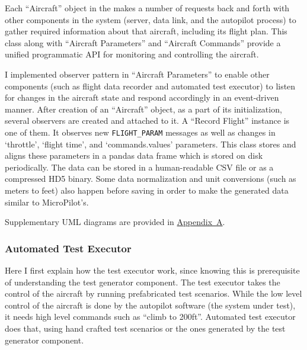 Each ``Aircraft'' object in the makes a number of requests back and forth with other components in the system (server, data link, and the autopilot process) to gather required information about that aircraft, including its flight plan. This class along with ``Aircraft Parameters'' and ``Aircraft Commands'' provide a unified programmatic API for monitoring and controlling the aircraft. 

I implemented observer pattern \cite{gamma1995design} in ``Aircraft Parameters'' to enable other components (such as flight data recorder and automated test executor) to listen for changes in the aircraft state and respond accordingly in an event-driven manner. 
After creation of an ``Aircraft'' object, as a part of its initialization, several observers are created and attached to it. A ``Record Flight'' instance is one of them. It observes new \verb|FLIGHT_PARAM| messages as well as changes in `throttle', `flight time', and `commands.values' parameters. This class stores and aligns these parameters in a pandas data frame which is stored on disk periodically. The data can be stored in a human-readable CSV file or as a compressed HD5 binary. Some data normalization and unit conversions (such as meters to feet) also happen before saving in order to make the generated data similar to MicroPilot's.

Supplementary UML diagrams are provided in \hyperref[appendixa]{Appendix~A}.


\subsubsection{Automated Test Executor}
Here I first explain how the test executor work, since knowing this is prerequisite of understanding the test generator component.
The test executor takes the control of the aircraft by running prefabricated test scenarios. While the low level control of the aircraft is done by the autopilot software (the system under test), it needs high level commands such as ``climb to 200ft''. Automated test executor does that, using hand crafted test scenarios or the ones generated by the test generator component.

